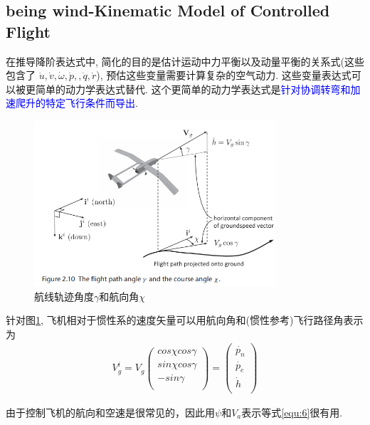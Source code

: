 \subsection{being wind-Kinematic Model of Controlled Flight}
在推导降阶表达式中, 简化的目的是估计运动中力平衡以及动量平衡的关系式(这些包含了 $\dot{u}, \dot{v}, \dot{\omega}, \dot{p}, , \dot{q}, \dot{r}$), 预估这些变量需要计算复杂的空气动力. 这些变量表达式可以被更简单的动力学表达式替代. 
这个更简单的动力学表达式是\textcolor{blue}{针对协调转弯和加速爬升的特定飞行条件而导出}.
\begin{figure}[htpb]
    \centering
    \includegraphics[width=0.8\textwidth]{pictures/2_10.png}
    \caption{航线轨迹角度$\gamma$和航向角$\chi$}
    \label{fig:2_10}
\end{figure}
针对图\ref{fig:2_10}, 飞机相对于惯性系的速度矢量可以用航向角和(惯性参考)飞行路径角表示为 
\begin{gather} %
    V_{g}^{i} = V_{g} \begin{pmatrix}
        cos \chi cos \gamma \\
        sin \chi cos \gamma \\
        -sin \gamma \\
      \end{pmatrix}
      = \begin{pmatrix}
        \dot{p_{n}} \\
        \dot{p_{e}} \\
        \dot{h} \\
      \end{pmatrix}
      \label{equ:6}
  \end{gather}
\par 由于控制飞机的航向和空速是很常见的，因此用$\psi$和$V_{a}$表示等式\ref{equ:6}很有用. 
